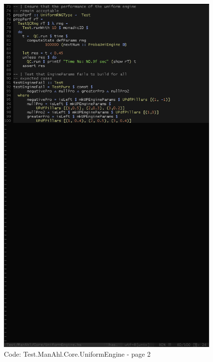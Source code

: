 \documentclass[12pt,a4paper,article]{memoir} %
\begin{document}
\begin{figure}[h!]
\centering
\includegraphics[width=1\textwidth]{img/code-test-uni-2.png}
\caption{Code: Test.ManAhl.Core.UniformEngine - page 2}
\label{fig:test.u2}
\end{figure}
\end{document}
